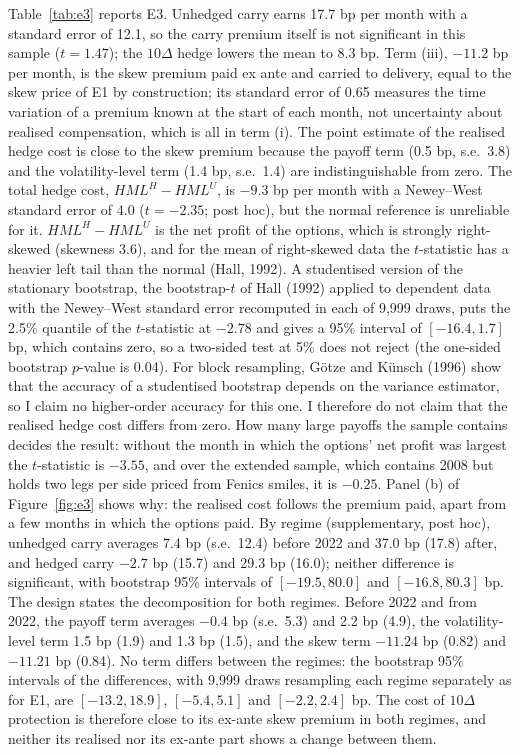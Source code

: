\documentclass[11pt]{article}
\theoremstyle{result}
\newcommand{\HML}{\mathit{HML}}
\newcommand{\D}{\Delta}
\begin{document}
Table~\ref{tab:e3} reports E3. Unhedged carry earns 17.7 bp per month with a standard error of 12.1, so the carry premium itself is not significant in this sample ($t=1.47$); the $10\D$ hedge lowers the mean to 8.3 bp. Term (iii), $-11.2$ bp per month, is the skew premium paid ex ante and carried to delivery, equal to the skew price of E1 by construction; its standard error of 0.65 measures the time variation of a premium known at the start of each month, not uncertainty about realised compensation, which is all in term (i). The point estimate of the realised hedge cost is close to the skew premium because the payoff term (0.5 bp, s.e.\ 3.8) and the volatility-level term (1.4 bp, s.e.\ 1.4) are indistinguishable from zero. The total hedge cost, $\HML^H-\HML^U$, is $-9.3$ bp per month with a Newey--West standard error of 4.0 ($t=-2.35$; post hoc), but the normal reference is unreliable for it. $\HML^H-\HML^U$ is the net profit of the options, which is strongly right-skewed (skewness 3.6), and for the mean of right-skewed data the $t$-statistic has a heavier left tail than the normal (Hall, 1992). A studentised version of the stationary bootstrap, the bootstrap-$t$ of Hall (1992) applied to dependent data with the Newey--West standard error recomputed in each of 9,999 draws, puts the 2.5\% quantile of the $t$-statistic at $-2.78$ and gives a 95\% interval of $[-16.4,1.7]$ bp, which contains zero, so a two-sided test at 5\% does not reject (the one-sided bootstrap $p$-value is 0.04). For block resampling, G\"otze and K\"unsch (1996) show that the accuracy of a studentised bootstrap depends on the variance estimator, so I claim no higher-order accuracy for this one. I therefore do not claim that the realised hedge cost differs from zero. How many large payoffs the sample contains decides the result: without the month in which the options' net profit was largest the $t$-statistic is $-3.55$, and over the extended sample, which contains 2008 but holds two legs per side priced from Fenics smiles, it is $-0.25$. Panel (b) of Figure~\ref{fig:e3} shows why: the realised cost follows the premium paid, apart from a few months in which the options paid. By regime (supplementary, post hoc), unhedged carry averages 7.4 bp (s.e.\ 12.4) before 2022 and 37.0 bp (17.8) after, and hedged carry $-2.7$ bp (15.7) and 29.3 bp (16.0); neither difference is significant, with bootstrap 95\% intervals of $[-19.5,80.0]$ and $[-16.8,80.3]$ bp. The design states the decomposition for both regimes. Before 2022 and from 2022, the payoff term averages $-0.4$ bp (s.e.\ 5.3) and 2.2 bp (4.9), the volatility-level term 1.5 bp (1.9) and 1.3 bp (1.5), and the skew term $-11.24$ bp (0.82) and $-11.21$ bp (0.84). No term differs between the regimes: the bootstrap 95\% intervals of the differences, with 9,999 draws resampling each regime separately as for E1, are $[-13.2,18.9]$, $[-5.4,5.1]$ and $[-2.2,2.4]$ bp. The cost of $10\D$ protection is therefore close to its ex-ante skew premium in both regimes, and neither its realised nor its ex-ante part shows a change between them.
\end{document}
